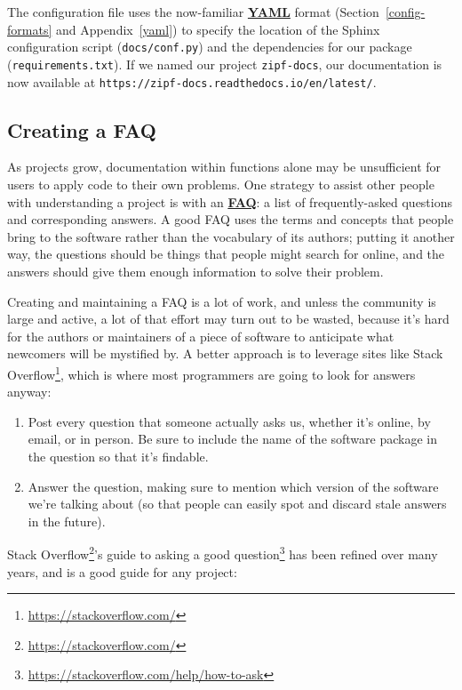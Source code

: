 \documentclass[
]{krantz}
\renewcommand{\href}[2]{#2\footnote{\url{#1}}}
\newcommand{\gref}[2]{\hyperlink{#2}{\textbf{#1}}}
\begin{document}
The configuration file uses the now-familiar \gref{YAML}{yaml} format
(Section~\ref{config-formats} and Appendix~\ref{yaml})
to specify the location of the Sphinx configuration script (\texttt{docs/conf.py})
and the dependencies for our package (\texttt{requirements.txt}).
If we named our project \texttt{zipf-docs},
our documentation is now available at \texttt{https://zipf-docs.readthedocs.io/en/latest/}.

\hypertarget{project-faq}{%
\subsection{Creating a FAQ}\label{project-faq}}

As projects grow,
documentation within functions alone may be unsufficient for users to apply code to their own problems.
One strategy to assist other people with understanding a project is with
an \gref{FAQ}{faq}:
a list of frequently-asked questions and corresponding answers.
A good FAQ uses the terms and concepts that people bring to the software
rather than the vocabulary of its authors;
putting it another way,
the questions should be things that people might search for online,
and the answers should give them enough information to solve their problem.

Creating and maintaining a FAQ is a lot of work,
and unless the community is large and active,
a lot of that effort may turn out to be wasted,
because it's hard for the authors or maintainers of a piece of software
to anticipate what newcomers will be mystified by.
A better approach is to leverage sites like \href{https://stackoverflow.com/}{Stack Overflow},
which is where most programmers are going to look for answers anyway:

\begin{enumerate}
\def\labelenumi{\arabic{enumi}.}
\item
  Post every question that someone actually asks us,
  whether it's online, by email, or in person.
  Be sure to include the name of the software package in the question
  so that it's findable.
\item
  Answer the question,
  making sure to mention which version of the software we're talking about
  (so that people can easily spot and discard stale answers in the future).
\end{enumerate}

\href{https://stackoverflow.com/}{Stack Overflow}'s guide to \href{https://stackoverflow.com/help/how-to-ask}{asking a good question}
has been refined over many years,
and is a good guide for any project:
\end{document}
